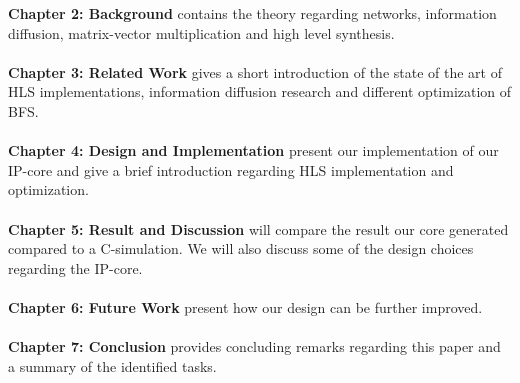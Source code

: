 \textbf{Chapter 2: Background} contains the theory regarding networks, information diffusion, matrix-vector multiplication and high level synthesis. \\ \hfil \\ \hfil
\textbf{Chapter 3: Related Work} gives a short introduction of the state of the art of HLS implementations, information diffusion research and different optimization of BFS.\\ \hfil \\ \hfil
\textbf{Chapter 4: Design and Implementation} present our implementation of our IP-core and give a brief introduction regarding HLS implementation and optimization.  \\ \hfil \\ \hfil
\textbf{Chapter 5: Result and Discussion} will compare the result our core generated compared to a C-simulation. We will also discuss some of the design choices regarding the IP-core. \\ \hfil \\ \hfil
\textbf{Chapter 6: Future Work} present how our design can be further improved. \\ \hfil \\ \hfil
\textbf{Chapter 7: Conclusion} provides concluding remarks regarding this paper and a summary of the identified tasks. \\ \hfil \\ \hfil